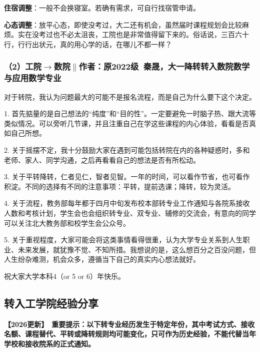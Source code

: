 \documentclass[11pt,oneside]{book}
\newcommand{\updateMark}{\textcolor{chaph}{\textbf{【2026更新】}}\ }
\begin{document}
\textbf{住宿调整}：一般不会换寝室。若确有需求，可自行找宿管申请。

\vspace{10pt}

\textbf{心态调整}：放平心态，即使没考过，大二还有机会，虽然届时课程规划会比较麻烦。实在没考过也不必太沮丧，工院也是非常值得留下来的。俗话说，三百六十行，行行出状元，真的用心学的话，在哪儿不都一样？

\subsubsection{（2）工院$\to$数院$\parallel$作者：原2022级\ 秦晟，大一降转转入数院数学与应用数学专业}
对于转院，我认为问题最大的可能不是报名流程，而是自己为什么要下这个决定。

\vspace{10pt}

1. 首先掂量的是自己想法的“纯度”和“目的性”。一定要避免一时脑子热、跟大流等类似情况。可以旁听几节课，并且注重自己在学这些课程的内心体验，看看是否真如自己所想。

\vspace{10pt}

2. 关于摇摆不定，我十分鼓励大家在遇到可能包括转院在内的各种疑惑时，多和老师、家人、同学沟通，之后再看看自己的想法是否有所松动。

\vspace{10pt}

3. 关于平转降转，仁者见仁，智者见智。一年的时间，可以看作节省，也可看作积淀。不同的选择有不同的注意事项：平转，提前选课；降转，较为灵活。

\vspace{10pt}

4. 关于流程，教务部每年都于四月中旬发布校本部转专业工作通知与各院系接收人数和考核计划，学生会也会组织转专业、双专业、辅修的交流会，有意向的同学可以关注北大教务部和校学生会公众号。

\vspace{10pt}

5. 关于重视程度，大家可能会将这类事情看得很重，认为大学专业关系到人生职业、未来发展，就犹豫不觉、不知所措。我想说的是，这么想百分之百没问题，但人生纷杂难测，机会众多，遵循当下自己的真实内心想法就好。

\vspace{10pt}

祝大家大学本科4（or 5 or 6）年快乐。

\subsection{转入工学院经验分享}
\updateMark\textbf{重要提示：以下转专业经历发生于特定年份，其中考试方式、接收名额、课程替代、平转或降转规则均可能变化，只可作为历史经验，不能代替当年学校和接收院系的正式通知。}
\end{document}
